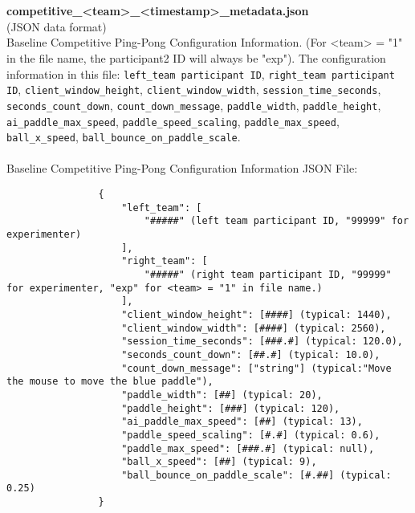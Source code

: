\begin{description}
\begin{addmargin}[0em]{0em}
        \textbf{\\\\}
        \begin{addmargin}[1em]{0em} %
            \textbf{competitive\_<team>\_<timestamp>\_metadata.json}\\(JSON data format)\\
            Baseline Competitive Ping-Pong Configuration Information.
            (For <team> = "1" in the file name, the participant2 ID will always be "exp").
            The configuration information in this file: \verb|left_team participant ID|, \verb|right_team participant ID|,
            \verb|client_window_height|, \verb|client_window_width|, \verb|session_time_seconds|,
            \verb|seconds_count_down|, \verb|count_down_message|, \verb|paddle_width|, \verb|paddle_height|,
            \verb|ai_paddle_max_speed|, \verb|paddle_speed_scaling|, \verb|paddle_max_speed|, \verb|ball_x_speed|,
            \verb|ball_bounce_on_paddle_scale|.\\\\
            Baseline Competitive Ping-Pong Configuration Information JSON File:
            \begin{verbatim}
                {
                    "left_team": [
                        "#####" (left team participant ID, "99999" for experimenter)
                    ],
                    "right_team": [
                        "#####" (right team participant ID, "99999" for experimenter, "exp" for <team> = "1" in file name.)
                    ],
                    "client_window_height": [####] (typical: 1440),
                    "client_window_width": [####] (typical: 2560),
                    "session_time_seconds": [###.#] (typical: 120.0),
                    "seconds_count_down": [##.#] (typical: 10.0),
                    "count_down_message": ["string"] (typical:"Move the mouse to move the blue paddle"),
                    "paddle_width": [##] (typical: 20),
                    "paddle_height": [###] (typical: 120),
                    "ai_paddle_max_speed": [##] (typical: 13),
                    "paddle_speed_scaling": [#.#] (typical: 0.6),
                    "paddle_max_speed": [###.#] (typical: null),
                    "ball_x_speed": [##] (typical: 9),
                    "ball_bounce_on_paddle_scale": [#.##] (typical: 0.25)
                }
            \end{verbatim}
        \end{addmargin} %



\end{addmargin}
\end{description}
